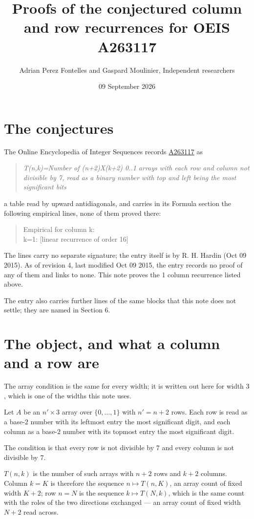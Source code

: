 \documentclass[11pt]{article}
\title{Proofs of the conjectured column and row recurrences for OEIS A263117}
\author{Adrian Perez Fontelles and Gaspard Moulinier, Independent researchers}
\date{09 September 2026}
\theoremstyle{definition}
\begin{document}
\maketitle
\section{The conjectures}

The Online Encyclopedia of Integer Sequences records \href{https://oeis.org/A263117}{A263117} as

\begin{quote}\itshape T(n,k)=Number of (n+2)X(k+2) 0..1 arrays with each row and column not divisible by 7, read as a binary number with top and left being the most significant bits\end{quote}

a table read by upward antidiagonals, and carries in its Formula section the following empirical lines, none of them proved there:

\begin{quote}\ttfamily Empirical for column k:\\
k=1: [linear recurrence of order 16]\end{quote}

The lines carry no separate signature; the entry itself is by R. H. Hardin (Oct 09 2015). As of revision 4, last modified Oct 09 2015, the entry records no proof of any of them and links to none. This note proves the 1 column recurrence listed above.

The entry also carries further lines of the same blocks that this note does not settle; they are named in Section 6.

\section{The object, and what a column and a row are}

The array condition is the same for every width; it is written out here for width $3$, which is one of the widths this note uses.

Let $A$ be an $n' \times 3$ array over $\{0,\dots,1\}$ with $n' = n + 2$ rows. Each row is read as a base-$2$ number with its leftmost entry the most significant digit, and each column as a base-$2$ number with its topmost entry the most significant digit.

The condition is that every row is not divisible by $7$ and every column is not divisible by $7$.

$T(n,k)$ is the number of such arrays with $n + 2$ rows and $k + 2$ columns. Column $k = K$ is therefore the sequence $n \mapsto T(n,K)$, an array count of fixed width $K + 2$; row $n = N$ is the sequence $k \mapsto T(N,k)$, which is the same count with the roles of the two directions exchanged --- an array count of fixed width $N + 2$ read across.
\end{document}

